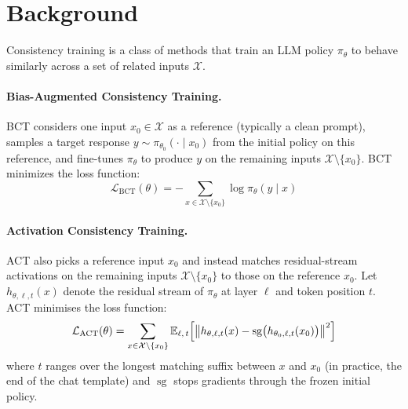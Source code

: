 \documentclass{article}
\begin{document}
\section{Background}

Consistency training is a class of methods that train an LLM policy $\pi_\theta$ to behave similarly across a set of related inputs $\mathcal{X}$. 

\paragraph{Bias-Augmented Consistency Training.}
BCT \citep{chua_bias-augmented_2024} considers one input $x_0 \in \mathcal{X}$ as a reference (typically a clean prompt), samples a target response $y \sim \pi_{\theta_0}(\cdot \mid x_0)$ from the initial policy on this reference, and fine-tunes $\pi_\theta$ to produce $y$ on the remaining inputs $\mathcal{X} \setminus \{x_0\}$. BCT minimizes the loss function:
\begin{equation} \label{eq: BCT loss}
\mathcal{L}_{\text{BCT}}(\theta) = -\sum_{x \in \mathcal{X} \setminus \{x_0\}} \log \pi_\theta(y \mid x)
\end{equation} 

\paragraph{Activation Consistency Training.}
ACT \citep{irpan_consistency_2025} also picks a reference input $x_0$ and instead matches residual-stream activations on the remaining inputs $\mathcal{X} \setminus \{x_0\}$ to those on the reference $x_0$. Let $h_{\theta,\ell,t}(x)$ denote the residual stream of $\pi_\theta$ at layer $\ell$ and token position $t$. ACT minimises the loss function:
\begin{equation}
\mathcal{L}_{\text{ACT}}(\theta) = \sum_{x \in \mathcal{X} \setminus \{x_0\}} \mathbb{E}_{\ell,\, t}\Bigl[\bigl\| h_{\theta,\ell,t}(x) - \operatorname{sg}\bigl(h_{\theta_0,\ell,t}(x_0)\bigr) \bigr\|^2\Bigr]
\end{equation}
where $t$ ranges over the longest matching suffix between $x$ and $x_0$ (in practice, the end of the chat template) and $\operatorname{sg}$ stops gradients through the frozen initial policy.
\end{document}
